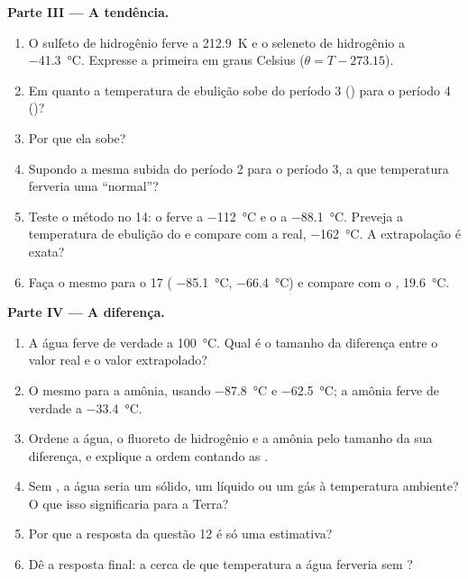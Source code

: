 \begin{problem}
\medskip
\noindent\textbf{Parte III --- A tendência.}
\begin{enumerate}[resume]
  \item O sulfeto de hidrogênio ferve a \qty{212.9}{K} e o seleneto de
        hidrogênio a \qty{-41.3}{\celsius}. Expresse a primeira em graus
        Celsius ($\theta = T - 273.15$).
  \item Em quanto a temperatura de ebulição sobe do período 3
        () para o período 4 ()?
  \item Por que ela sobe?
  \item Supondo a mesma subida do período 2 para o período 3, a que
        temperatura ferveria uma  ``normal''?
  \item Teste o método no  14: o  ferve a
        \qty{-112}{\celsius} e o  a \qty{-88.1}{\celsius}.
        Preveja a temperatura de ebulição do  e compare com a
        real, \qty{-162}{\celsius}. A extrapolação é exata?
  \item Faça o mesmo para o  17 ( \qty{-85.1}{\celsius},
         \qty{-66.4}{\celsius}) e compare com o ,
        \qty{19.6}{\celsius}.
\end{enumerate}

\medskip
\noindent\textbf{Parte IV --- A diferença.}
\begin{enumerate}[resume]
  \item A água ferve de verdade a \qty{100}{\celsius}. Qual é o tamanho
        da diferença entre o valor real e o valor extrapolado?
  \item O mesmo para a amônia, usando  \qty{-87.8}{\celsius} e
         \qty{-62.5}{\celsius}; a amônia ferve de verdade a
        \qty{-33.4}{\celsius}.
  \item Ordene a água, o fluoreto de hidrogênio e a amônia pelo tamanho
        da sua diferença, e explique a ordem contando as .
  \item Sem , a água seria um sólido, um líquido ou
        um gás à temperatura ambiente? O que isso significaria para a
        Terra?
  \item Por que a resposta da questão 12 é só uma estimativa?
  \item Dê a resposta final: a cerca de que temperatura a água ferveria
        sem ?
\end{enumerate}
\end{problem}
